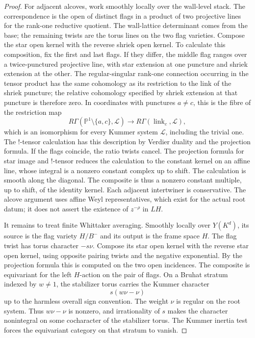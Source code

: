 \begin{proof}
For adjacent alcoves, work smoothly locally over the wall-level stack.
The correspondence is the open of distinct flags in a product of two
projective lines for the rank-one reductive quotient.  The wall-lattice
determinant comes from the base; the remaining twists are the torus lines
on the two flag varieties.  Compose the star open kernel with the
reverse shriek open kernel.  To calculate this composition, fix the
first and last flags.  If they differ, the middle flag ranges over a
twice-punctured projective line, with star extension at one puncture and
shriek extension at the other.  The regular-singular rank-one
connection occurring in the tensor product has the same cohomology as
its restriction to the link of the shriek puncture; the relative
cohomology specified by shriek extension at that puncture is
therefore zero.  In coordinates with punctures $a\ne c$, this is the
fibre of the restriction map
\[
 R\Gamma(\mathbb P^1\setminus\{a,c\},\mathcal L)
       \longrightarrow R\Gamma(\operatorname{link}_c,\mathcal L),
\]
which is an isomorphism for every Kummer system $\mathcal L$, including
the trivial one.  The $!$-tensor calculation has this description by
Verdier duality and the projection formula.  If the flags coincide,
the ratio twists cancel.  The
projection formula for star image and $!$-tensor reduces the calculation
to the constant kernel on an affine line, whose integral is a nonzero
constant complex up to shift.  The calculation is smooth along the
diagonal.  The composite is thus a nonzero constant multiple, up to
shift, of the identity kernel.  Each adjacent intertwiner is
conservative.  The alcove argument uses affine Weyl representatives,
which exist for the actual root datum; it does not assert the existence
of $z^{-\rho}$ in $LH$.

It remains to treat finite Whittaker averaging.  Smoothly locally over
$Y(K^d)$, its source is the flag variety $H/B^-$ and its output is the
frame space $H$.  The flag twist has torus character $-s\nu$.
Compose its star open kernel with the reverse star open kernel, using
opposite pairing twists and the negative exponential.  By the
projection formula this is computed on the two open incidences.
The composite is equivariant for the left $H$-action on the pair of
flags.  On a Bruhat stratum indexed by $w\ne1$, the stabilizer torus
carries the Kummer character
\[
 s(w\nu-\nu)
\]
up to the harmless overall sign convention.  The weight $\nu$ is regular
on the root system.  Thus $w\nu-\nu$ is nonzero, and irrationality of
$s$ makes the character nonintegral on some cocharacter of the
stabilizer torus.  The Kummer inertia test forces the equivariant
category on that stratum to vanish.


\end{proof}
